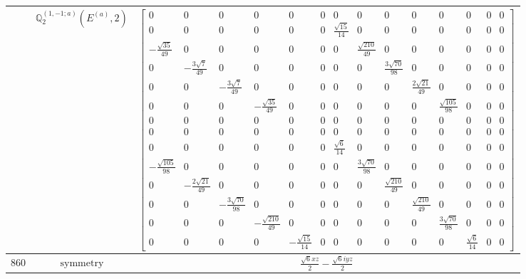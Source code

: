\documentclass[fleqn,8pt,landscape]{jsarticle}
\begin{document}
\begin{longtable}{ccc}
$  $ & $ \mathbb{Q}_{2}^{(1,-1;a)}(E^{(a)},2) $ & $ \begin{bmatrix} 0 & 0 & 0 & 0 & 0 & 0 & 0 & 0 & 0 & 0 & 0 & 0 & 0 & 0 \\ 0 & 0 & 0 & 0 & 0 & 0 & \frac{\sqrt{15}}{14} & 0 & 0 & 0 & 0 & 0 & 0 & 0 \\ - \frac{\sqrt{35}}{49} & 0 & 0 & 0 & 0 & 0 & 0 & \frac{\sqrt{210}}{49} & 0 & 0 & 0 & 0 & 0 & 0 \\ 0 & - \frac{3 \sqrt{7}}{49} & 0 & 0 & 0 & 0 & 0 & 0 & \frac{3 \sqrt{70}}{98} & 0 & 0 & 0 & 0 & 0 \\ 0 & 0 & - \frac{3 \sqrt{7}}{49} & 0 & 0 & 0 & 0 & 0 & 0 & \frac{2 \sqrt{21}}{49} & 0 & 0 & 0 & 0 \\ 0 & 0 & 0 & - \frac{\sqrt{35}}{49} & 0 & 0 & 0 & 0 & 0 & 0 & \frac{\sqrt{105}}{98} & 0 & 0 & 0 \\ 0 & 0 & 0 & 0 & 0 & 0 & 0 & 0 & 0 & 0 & 0 & 0 & 0 & 0 \\ 0 & 0 & 0 & 0 & 0 & 0 & 0 & 0 & 0 & 0 & 0 & 0 & 0 & 0 \\ 0 & 0 & 0 & 0 & 0 & 0 & \frac{\sqrt{6}}{14} & 0 & 0 & 0 & 0 & 0 & 0 & 0 \\ - \frac{\sqrt{105}}{98} & 0 & 0 & 0 & 0 & 0 & 0 & \frac{3 \sqrt{70}}{98} & 0 & 0 & 0 & 0 & 0 & 0 \\ 0 & - \frac{2 \sqrt{21}}{49} & 0 & 0 & 0 & 0 & 0 & 0 & \frac{\sqrt{210}}{49} & 0 & 0 & 0 & 0 & 0 \\ 0 & 0 & - \frac{3 \sqrt{70}}{98} & 0 & 0 & 0 & 0 & 0 & 0 & \frac{\sqrt{210}}{49} & 0 & 0 & 0 & 0 \\ 0 & 0 & 0 & - \frac{\sqrt{210}}{49} & 0 & 0 & 0 & 0 & 0 & 0 & \frac{3 \sqrt{70}}{98} & 0 & 0 & 0 \\ 0 & 0 & 0 & 0 & - \frac{\sqrt{15}}{14} & 0 & 0 & 0 & 0 & 0 & 0 & \frac{\sqrt{6}}{14} & 0 & 0 \end{bmatrix} $ \\ \hline
$ 860 $ & $ \text{symmetry} $ & $ \frac{\sqrt{6} x z}{2} - \frac{\sqrt{6} i y z}{2} $ \\

\end{longtable}
\end{document}
